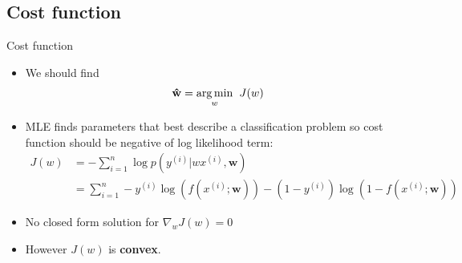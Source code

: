 \documentclass[serif, aspectratio=169]{beamer}
\begin{document}
\subsection{Cost function}
\begin{frame}{Cost function}
    \begin{itemize}
    \item We should find 
        \begin{align*}
            \mathbf{\hat{w}} = \underset{w}{\arg\min} \hspace{0.2cm} J(w)
        \end{align*}
        \item MLE finds parameters that best describe a classification problem so cost function should be negative of log likelihood term:
        \begin{align*}
            J(w) &= -\sum_{i=1}^{n} \log p(y^{(i)}|wx^{(i)}, \mathbf{w})\\
            &= \sum_{i=1}^{n}-y^{(i)}\log (f(x^{(i)}; \mathbf{w})) - 
            (1-y^{(i)})\log (1 - f(x^{(i)}; \mathbf{w}))
        \end{align*}
        \item No closed form solution for $\nabla _w J(w) = 0$
        \item However $J(w)$ is \textbf{convex}.
    \end{itemize}
\end{frame}
\end{document}
